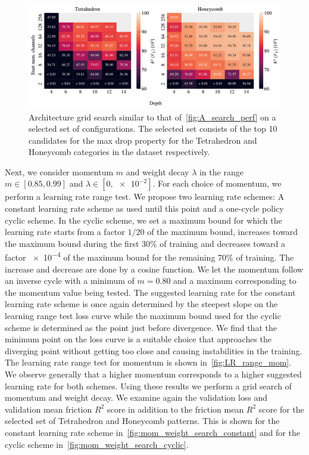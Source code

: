 \begin{figure}[!htb]
  \centering
  \includegraphics[width=\linewidth]{figures/ML/A_search_compare_perf}
  \caption{Architecture grid search similar to that of~\cref{fig:A_search_perf} on a selected set of configurations. The selected set consists of the top 10 candidates for the max drop property for the Tetrahedron and Honeycomb categories in the dataset respectively.}
  \label{fig:A_search_compare}
\end{figure}  



Next, we consider momentum $m$ and weight decay $\lambda$ in the range $m \in
[0.85, 0.99]$ and $\lambda \in [0, \num{e-2}]$. For each choice of momentum, we
perform a learning rate range test. We propose two learning rate schemes: A
constant learning rate scheme as used until this point and a one-cycle policy cyclic scheme. In the cyclic scheme, we set a maximum bound for which the learning rate starts from a factor $1/20$ of the maximum bound, increases toward the maximum bound during the first $30\%$ of training and decreases toward a factor \num{e-4} of the maximum bound for the remaining 70\% of training. The increase
and decrease are done by a cosine function. We let the momentum follow an inverse cycle with a minimum of $m = 0.80$ and a maximum corresponding to the momentum value being tested. The suggested learning rate for the
constant learning rate scheme is once again determined by the steepest slope on
the learning range test loss curve while the maximum bound used for the
cyclic scheme is determined as the point just before divergence. We find that
the minimum point on the loss curve is a suitable choice that approaches the
diverging point without getting too close and causing instabilities in the
training. The learning rate range test for momentum is shown
in~\cref{fig:LR_range_mom}. We observe generally that a higher momentum
corresponds to a higher suggested learning rate for both schemes. Using these
results we perform a grid search of momentum and weight decay. We examine again
the validation loss and validation mean friction $R^2$ score in addition to the
friction mean $R^2$ score for the selected set of Tetrahedron and Honeycomb
patterns. This is shown for the constant learning rate scheme
in~\cref{fig:mom_weight_search_constant} and for the cyclic scheme
in~\cref{fig:mom_weight_search_cyclic}.


